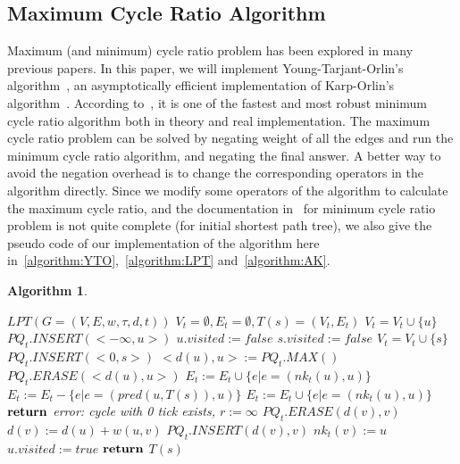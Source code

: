 \documentclass[sigconf, 10pt, twocolumn]{acmart}
\newtheorem{algorithm}{Algorithm}
\begin{document}
\subsection{Maximum Cycle Ratio Algorithm}
Maximum (and minimum) cycle ratio problem has been explored in many previous papers. In this paper, we will implement Young-Tarjant-Orlin's algorithm~\cite{Neal:Faster}, an asymptotically efficient implementation of Karp-Orlin's algorithm~\cite{Karp:Parametric}. According to~\cite{Dasdan:Experimental}, it is one of the fastest and most robust minimum cycle ratio algorithm both in theory and real implementation. The maximum cycle ratio problem can be solved by negating weight of all the edges and run the minimum cycle ratio algorithm, and negating the final answer. A better way to avoid the negation overhead is to change the corresponding operators in the algorithm directly. Since we modify some operators of the algorithm to calculate the maximum cycle ratio, and the documentation in~\cite{Neal:Faster,Dasdan:Experimental} for minimum cycle ratio problem is not quite complete (for initial shortest path tree), we also give the pseudo code of our implementation of the algorithm here in~\ref{algorithm:YTO},~\ref{algorithm:LPT} and~\ref{algorithm:AK}.

\begin{algorithm} \small
\begin{algorithmic}
\State $LPT(G = (V, E, w, \tau, d, t))$
\State $V_t = \emptyset, E_t = \emptyset, T(s) = (V_t, E_t)$
\State $V_t = V_t \cup \{u\}$
\State $PQ_t.INSERT(<-\infty, u>)$
\State $u.visited := false$
\EndFor
\State $s.visited := false$
\State $V_t = V_t \cup \{s\}$
\State $PQ_t.INSERT(<0, s>)$
\State $<d(u), u> := PQ_t.MAX()$
\State $PQ_t.ERASE(<d(u), u>)$
\State $E_t := E_t \cup \{e | e = (nk_t(u), u)\}$
\Else
\State $E_t := E_t - \{e | e = (pred(u, T(s)), u)\}$
\State $E_t := E_t \cup \{e | e = (nk_t(u), u)\}$
\State $\bold{return}$ error: cycle with 0 tick exists, $r := \infty$
\EndIf
\EndIf
{}
\State $PQ_t.ERASE(d(v), v)$
\State $d(v) := d(u) + w(u, v)$
\State $PQ_t.INSERT(d(v), v)$
\State $nk_t(v) := u$
\EndIf
\EndFor
{}
\State $u.visited := true$
\EndIf
\EndWhile
\State $\bold{return}$  $T(s)$
\end{algorithmic}
\caption{Dijkstra's Longest-Path-Tree Algorithm}
\label{algorithm:LPT}
\end{algorithm}
\end{document}

